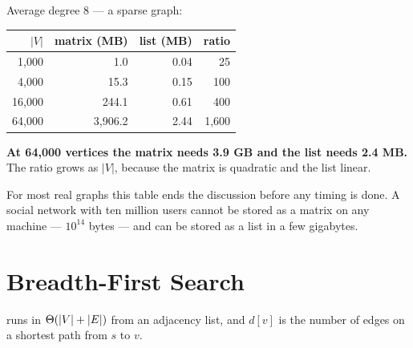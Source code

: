 \begin{worked}
Average degree 8 --- a sparse graph:

\begin{center}
\begin{tabular}{@{}rrrr@{}}
\toprule
\rowcolor{primary!15}
$|V|$ & matrix (MB) & list (MB) & ratio \\
\midrule
 1{,}000 &     1.0 & 0.04 &     25 \\
 4{,}000 &    15.3 & 0.15 &    100 \\
16{,}000 &   244.1 & 0.61 &    400 \\
64{,}000 & 3{,}906.2 & 2.44 & 1{,}600 \\
\bottomrule
\end{tabular}
\end{center}

\smallskip
\textbf{At 64{,}000 vertices the matrix needs 3.9 GB and the list needs 2.4
MB.} The ratio grows as $|V|$, because the matrix is quadratic and the list
linear.

\smallskip
For most real graphs this table ends the discussion before any timing is done.
A social network with ten million users cannot be stored as a matrix on any
machine --- $10^{14}$ bytes --- and can be stored as a list in a few gigabytes.
\end{worked}

\section{Breadth-First Search}


\begin{theorem}[BFS]\label{thm:bfs}
 runs in $\Theta(|V| + |E|)$ from an adjacency list, and
$d[v]$ is the number of edges on a shortest path from $s$ to $v$.
\end{theorem}

